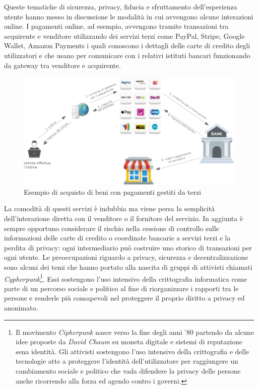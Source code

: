 Queste tematiche di sicurezza, privacy, fiducia e sfruttamento dell'esperienza utente hanno messo in discussione le modalità in cui avvengono alcune interazioni online. I pagamenti online, ad esempio, avvengono tramite transazioni tra acquirente e venditore utilizzando dei servizi terzi come PayPal, Stripe, Google Wallet, Amazon Payments i quali conoscono i dettagli delle carte di credito degli utilizzatori e che usano per comunicare con i relativi istituti bancari funzionando da gateway tra venditore e acquirente.\newline
\begin{figure}
    \centering
    \includegraphics[width=\textwidth]{images/onlinepayments.png}
    \caption{Esempio di acquisto di beni con pagamenti gestiti da terzi}
\end{figure}
La comodità di questi servizi è indubbia ma viene persa la semplicità dell'interazione diretta con il venditore o il fornitore del servizio. In aggiunta è sempre opportuno considerare il rischio nella cessione di controllo sulle informazioni delle carte di credito o coordinate bancarie a servizi terzi e la perdita di privacy: ogni intermediario può costruire uno storico di transazioni per ogni utente.\newline\newline
Le preoccupazioni riguardo a privacy, sicurezza e decentralizzazione sono alcuni dei temi che hanno portato alla nascita di gruppi di attivisti chiamati \textit{Cypherpunk}\footnote{Il movimento \textit{Cipherpunk} nasce verso la fine degli anni '80 partendo da alcune idee proposte da \textit{David Chaum} su moneta digitale e sistemi di reputazione sena identità. Gli attivisti sostengono l'uso intensivo della crittografia e delle tecnologie atte a proteggere l'identità dell'utilizzatore per raggiungere un cambiamento sociale e politico che vada difendere la privacy delle persone anche ricorrendo alla forza ed agendo contro i governi.}. Essi sostengono l'uso intensivo della crittografia informatica come parte di un percorso sociale e politico al fine di riorganizzare i rapporti tra le persone e renderle più consapevoli nel proteggere il proprio diritto a privacy ed anonimato.\newline\newline
